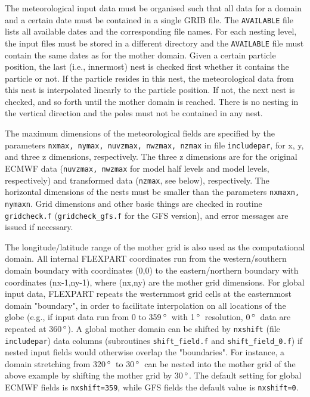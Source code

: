 \documentclass{egu}            %
\newcommand{\degreee}{{$\, \rm ^{\circ}$}}
\newcommand{\degreen}{{$\, \rm ^{\circ}$~}}
\begin{document}
The meteorological input data must be organised such that all data for a domain
and a certain date must be contained in a single GRIB file.  The
\verb|AVAILABLE| file lists all available dates and the corresponding file
names.  For each nesting level, the input files must be stored in a different
directory and the \verb|AVAILABLE| file must contain the same dates as for the
mother domain.  Given a certain particle position, the last (i.e., innermost)
nest is checked first whether it contains the particle or not.  If the particle
resides in this nest, the meteorological data from this nest is interpolated
linearly to the particle position.  If not, the next nest is checked, and so
forth until the mother domain is reached.  There is no nesting in the vertical
direction and the poles must not be contained in any nest.

The maximum dimensions of the meteorological fields are specified by the
parameters \verb|nxmax, nymax, nuvzmax, nwzmax, nzmax| in file
\verb|includepar|, for x, y, and three z dimensions, respectively.  The three z
dimensions are for the original ECMWF data (\verb|nuvzmax, nwzmax| for model
half levels and model levels, respectively) and transformed data (\verb|nzmax|,
see below), respectively.  The horizontal dimensions of the nests must be
smaller than the parameters \verb|nxmaxn, nymaxn|.  Grid dimensions and other
basic things are checked in routine \verb|gridcheck.f| (\verb|gridcheck_gfs.f|
for the GFS version), and error messages are issued if necessary.

The longitude/latitude range of the mother grid is also used as the
computational domain.  All internal FLEXPART coordinates run from the
western/southern domain boundary with coordinates (0,0) to the eastern/northern
boundary with coordinates (nx-1,ny-1), where (nx,ny) are the mother grid
dimensions.  For global input data, FLEXPART repeats the westernmost grid cells
at the easternmost domain "boundary", in order to facilitate interpolation on
all locations of the globe (e.g., if input data run from 0 to 359\degreen with
1\degreen resolution, 0\degreen data are repeated at 360\degreee).  A global
mother domain can be shifted by \verb|nxshift| (file \verb|includepar|) data
columns (subroutines \verb|shift_field.f| and \verb|shift_field_0.f|) if nested
input fields would otherwise overlap the "boundaries".  For instance, a domain
stretching from 320\degreen to 30\degreen can be nested into the mother grid of
the above example by shifting the mother grid by 30\degreee. The default setting
for global ECMWF fields is \verb|nxshift=359|, while GFS fields the default
value is \verb|nxshift=0|.
\end{document}
